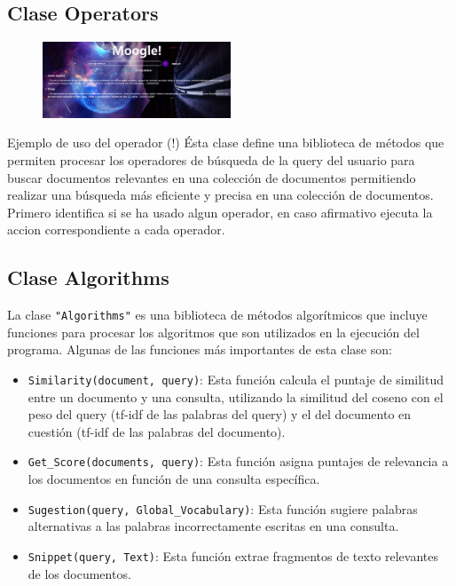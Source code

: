 \documentclass{article}
\begin{document}
\subsection{Clase Operators}

\begin{figure}[h!]
\centering
\includegraphics[width=0.5\textwidth]{../Informe/photos/img_7.png}
\end{figure}

\begin{center}
Ejemplo de uso del operador (!)
Ésta clase define una biblioteca de métodos que permiten procesar los operadores de búsqueda de la query del usuario para buscar documentos relevantes en una colección de documentos permitiendo realizar una búsqueda más eficiente y precisa en una colección de documentos.
Primero identifica si se ha usado algun operador, en caso afirmativo ejecuta la accion correspondiente a cada operador.
\end{center}

\subsection{Clase Algorithms}

La clase \texttt{"Algorithms"} es una biblioteca de métodos algorítmicos que incluye funciones para procesar los algoritmos que son utilizados en la ejecución del programa. Algunas de las funciones más importantes de esta clase son:

\begin{itemize}
\item \texttt{Similarity(document, query)}: Esta función calcula el puntaje de similitud entre un documento y una consulta, utilizando la similitud del coseno con el peso del query (tf-idf de las palabras del query) y el del documento en cuestión (tf-idf de las palabras del documento).
\item \texttt{Get\_Score(documents, query)}: Esta función asigna puntajes de relevancia a los documentos en función de una consulta específica.  
\item \texttt{Sugestion(query, Global\_Vocabulary)}: Esta función sugiere palabras alternativas a las palabras incorrectamente escritas en una consulta.
\item \texttt{Snippet(query, Text)}: Esta función extrae fragmentos de texto relevantes de los documentos.
\end{itemize}
\end{document}
